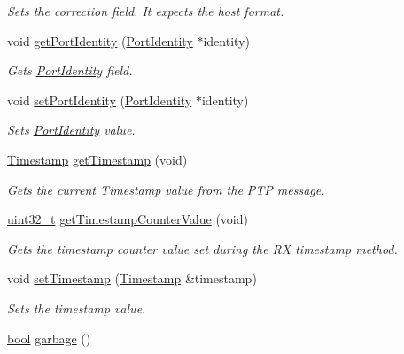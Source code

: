 \begin{DoxyCompactItemize}
\begin{DoxyCompactList}\small\item\em Sets the correction field. It expects the host format. \end{DoxyCompactList}\item 
void \hyperlink{class_p_t_p_message_common_a81caf27b0bcf771cb3c35d8fe42ae8ed}{get\+Port\+Identity} (\hyperlink{class_port_identity}{Port\+Identity} $\ast$identity)
\begin{DoxyCompactList}\small\item\em Gets \hyperlink{class_port_identity}{Port\+Identity} field. \end{DoxyCompactList}\item 
void \hyperlink{class_p_t_p_message_common_a94378ebb164e2095d3a17b393a63f2dc}{set\+Port\+Identity} (\hyperlink{class_port_identity}{Port\+Identity} $\ast$identity)
\begin{DoxyCompactList}\small\item\em Sets \hyperlink{class_port_identity}{Port\+Identity} value. \end{DoxyCompactList}\item 
\hyperlink{class_timestamp}{Timestamp} \hyperlink{class_p_t_p_message_common_a0bdaf174c565b4d10499011885dde906}{get\+Timestamp} (void)
\begin{DoxyCompactList}\small\item\em Gets the current \hyperlink{class_timestamp}{Timestamp} value from the P\+TP message. \end{DoxyCompactList}\item 
\hyperlink{parse_8c_a6eb1e68cc391dd753bc8ce896dbb8315}{uint32\+\_\+t} \hyperlink{class_p_t_p_message_common_a2f9298443285c8dd689acce23b59dc8f}{get\+Timestamp\+Counter\+Value} (void)
\begin{DoxyCompactList}\small\item\em Gets the timestamp counter value set during the RX timestamp method. \end{DoxyCompactList}\item 
void \hyperlink{class_p_t_p_message_common_aa35baf97ba1690eb11defa05a40f7d05}{set\+Timestamp} (\hyperlink{class_timestamp}{Timestamp} \&timestamp)
\begin{DoxyCompactList}\small\item\em Sets the timestamp value. \end{DoxyCompactList}\item 
\hyperlink{avb__gptp_8h_af6a258d8f3ee5206d682d799316314b1}{bool} \hyperlink{class_p_t_p_message_common_a1a2b4b1eeb289619b14affa39f8284f7}{garbage} ()

\end{DoxyCompactItemize}
